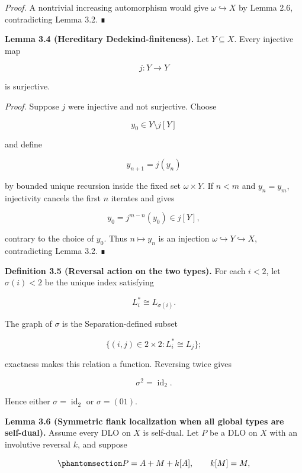 \documentclass[
  english,
  11pt,
  reqno]{amsart}
\begin{document}
\emph{Proof.} A nontrivial increasing automorphism would give
\(\omega\hookrightarrow X\) by Lemma 2.6, contradicting Lemma 3.2. ∎

\protect{}\label{lem:3-4-hereditary-dedekind}

\textbf{Lemma 3.4 (Hereditary Dedekind-finiteness).} Let
\(Y\subseteq X\). Every injective map

\[
j:Y\longrightarrow Y
\]

is surjective.

\emph{Proof.} Suppose \(j\) were injective and not surjective. Choose

\[
y_0\in Y\setminus j[Y]
\]

and define

\[
y_{n+1}=j(y_n)
\]

by bounded unique recursion inside the fixed set \(\omega\times Y\). If
\(n<m\) and \(y_n=y_m\), injectivity cancels the first \(n\) iterates
and gives

\[
y_0=j^{m-n}(y_0)\in j[Y],
\]

contrary to the choice of \(y_0\). Thus \(n\mapsto y_n\) is an injection
\(\omega\hookrightarrow Y\hookrightarrow X\), contradicting Lemma 3.2. ∎

\protect{}\label{def:3-5-reversal-action}

\textbf{Definition 3.5 (Reversal action on the two types).} For each
\(i<2\), let \(\sigma(i)<2\) be the unique index satisfying

\[
L_i^*\cong L_{\sigma(i)}.
\]

The graph of \(\sigma\) is the Separation-defined subset

\[
\{(i,j)\in2\times2:L_i^*\cong L_j\};
\]

exactness makes this relation a function. Reversing twice gives

\[
\sigma^2=\operatorname{id}_{2}.
\]

Hence either \(\sigma=\operatorname{id}_{2}\) or \(\sigma=(01)\).

\protect{}\label{lem:3-6-all-selfdual-flank}

\textbf{Lemma 3.6 (Symmetric flank localization when all global types
are self-dual).} Assume every DLO on \(X\) is self-dual. Let \(P\) be a
DLO on \(X\) with an involutive reversal \(k\), and suppose

\begin{equation}\protect\phantomsection\label{eq:all-selfdual-flank}{
P=A+M+k[A],
\qquad
k[M]=M,
}\end{equation}
\end{document}
